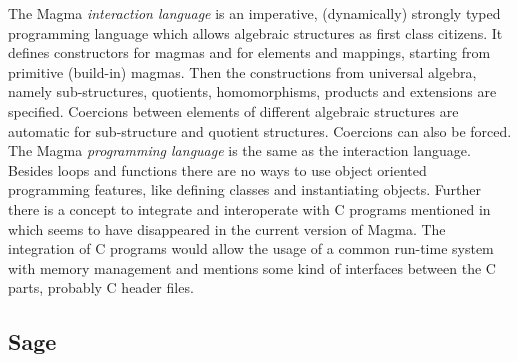 \documentclass{llncs}
\begin{document}
The Magma {\em interaction language} is an imperative, (dynamically)
strongly typed programming language which allows algebraic structures
as first class citizens. It defines constructors for magmas and for
elements and mappings, starting from primitive (build-in) magmas.
Then the constructions from universal algebra, namely sub-structures,
quotients, homomorphisms, products and extensions are specified.
Coercions between elements of different algebraic structures are
automatic for sub-structure and quotient structures.  Coercions can
also be forced. %
The Magma {\em programming language} is the same as the interaction
language. 
%
Besides loops and functions there are no ways to use object oriented
programming features, like defining classes and instantiating objects.
%
Further there is a concept to integrate and interoperate
with C programs mentioned in \cite{BosmaCannonMatthews:1994} which
seems to have disappeared in the current version of Magma.  The
integration of C programs would allow the usage of a common run-time
system with memory management and mentions some kind of interfaces
between the C parts, probably C header files.


\subsection{Sage} %
\end{document}
